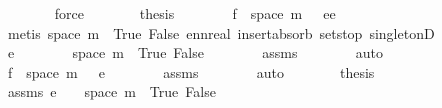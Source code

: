 \begin{isabellebody}
\ \ \ \ \ \ \isamarkupfalse%
\ force\isanewline
\ \ \ \ \isamarkupfalse%
\ \isamarkupfalse%
\ {\isacharquery}{\kern0pt}thesis\isanewline
\ \ \ \ \ \ \isamarkupfalse%
\ {\isacartoucheopen}f\ {\isacharbackquote}{\kern0pt}\ space\ m\ {\isacharequal}{\kern0pt}\ {\isacharbraceleft}{\kern0pt}{}{\isacharcomma}{\kern0pt}\ e{\isacharbraceright}{\kern0pt}{\isacartoucheclose}{\isacartoucheopen}e\ {\isacharequal}{\kern0pt}\ {}{\isacartoucheclose}\isanewline
\ \ \ \ \ \ \isamarkupfalse%
\ {\isacharparenleft}{\kern0pt}metis\ {\isacartoucheopen}space\ m\ {\isacharequal}{\kern0pt}\ {\isacharbraceleft}{\kern0pt}True{\isacharcomma}{\kern0pt}\ False{\isacharbraceright}{\kern0pt}{\isacartoucheclose}\ ennreal{\isacharunderscore}{\kern0pt}{}\ insert{\isacharunderscore}{\kern0pt}absorb{}\ sets{\isachardot}{\kern0pt}top\ singletonD{\isacharparenright}{\kern0pt}\isanewline
\ \ \isamarkupfalse%
\ \isanewline
\ \ \ \ \isamarkupfalse%
\ {\isachardoublequoteopen}e\ {\isasymnoteq}\ {}{\isachardoublequoteclose}\isanewline
\ \ \ \ \isamarkupfalse%
\ {\isachardoublequoteopen}space\ m\ {\isacharequal}{\kern0pt}\ {\isacharbraceleft}{\kern0pt}True{\isacharcomma}{\kern0pt}\ False{\isacharbraceright}{\kern0pt}{\isachardoublequoteclose}\isanewline
\ \ \ \ \ \ \isamarkupfalse%
\ assms{\isacharparenleft}{\kern0pt}{}{\isacharparenright}{\kern0pt}\isanewline
\ \ \ \ \ \ \isamarkupfalse%
\ auto\isanewline
\ \ \ \ \isamarkupfalse%
\ \isamarkupfalse%
\ {\isachardoublequoteopen}f\ {\isacharbackquote}{\kern0pt}\ space\ m\ {\isacharequal}{\kern0pt}\ {\isacharbraceleft}{\kern0pt}{}{\isacharcomma}{\kern0pt}\ e{\isacharbraceright}{\kern0pt}{\isachardoublequoteclose}\isanewline
\ \ \ \ \ \ \isamarkupfalse%
\ assms{\isacharparenleft}{\kern0pt}{}{\isacharparenright}{\kern0pt}\isanewline
\ \ \ \ \ \ \isamarkupfalse%
\ auto\isanewline
\ \ \ \ \isamarkupfalse%
\ \isamarkupfalse%
\ {\isacharquery}{\kern0pt}thesis\isanewline
\ \ \ \ \ \ \isamarkupfalse%
\ assms\ {\isacartoucheopen}e\ {\isasymnoteq}\ {}{\isacartoucheclose}\ \ {\isacartoucheopen}space\ m\ {\isacharequal}{\kern0pt}\ {\isacharbraceleft}{\kern0pt}True{\isacharcomma}{\kern0pt}\ False{\isacharbraceright}{\kern0pt}{\isacartoucheclose}\isanewline
\ \ \ \ \ \ \isamarkupfalse%

\end{isabellebody}
